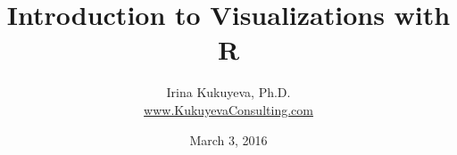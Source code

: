 \title{ Introduction to Visualizations with \ttfamily R \normalfont }
\author{Irina Kukuyeva, Ph.D. \\ \ttfamily \url{www.KukuyevaConsulting.com} \normalfont}
\date{March 3, 2016}



\frame{ \titlepage }
